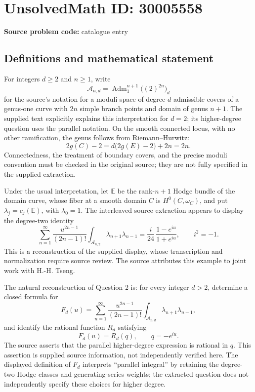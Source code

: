 \documentclass[11pt]{article}
\begin{document}
\section*{UnsolvedMath ID: 30005558}
\textbf{Source problem code:} catalogue entry
\subsection{Definitions and mathematical statement}
For integers \(d\geq 2\) and \(n\geq 1\), write
\[
\mathcal A_{n,d}=\operatorname{Adm}_{1}^{n+1}\bigl((2)^{2n}\bigr)_d
\]
for the source's notation for a moduli space of degree-\(d\) admissible covers of a genus-one curve with \(2n\) simple branch points and domain of genus \(n+1\). The supplied text explicitly explains this interpretation for \(d=2\); its higher-degree question uses the parallel notation. On the smooth connected locus, with no other ramification, the genus follows from Riemann--Hurwitz:
\[
2g(C)-2=d\bigl(2g(E)-2\bigr)+2n=2n.
\]
Connectedness, the treatment of boundary covers, and the precise moduli convention must be checked in the original source; they are not fully specified in the supplied extraction.

Under the usual interpretation, let \(\mathbb E\) be the rank-\(n+1\) Hodge bundle of the domain curve, whose fiber at a smooth domain \(C\) is \(H^0(C,\omega_C)\), and put \(\lambda_j=c_j(\mathbb E)\), with \(\lambda_0=1\). The interleaved source extraction appears to display the degree-two identity
\[
\sum_{n=1}^{\infty}\frac{u^{2n-1}}{(2n-1)!}
\int_{\mathcal A_{n,2}}\lambda_{n+1}\lambda_{n-1}
=\frac{i}{24}\,\frac{1-e^{iu}}{1+e^{iu}},
\qquad i^2=-1.
\]
This is a reconstruction of the supplied display, whose transcription and normalization require source review. The source attributes this example to joint work with H.-H. Tseng.

The natural reconstruction of Question 2 is: for every integer \(d>2\), determine a closed formula for
\[
F_d(u)=\sum_{n=1}^{\infty}\frac{u^{2n-1}}{(2n-1)!}
\int_{\mathcal A_{n,d}}\lambda_{n+1}\lambda_{n-1},
\]
and identify the rational function \(R_d\) satisfying
\[
F_d(u)=R_d(q),\qquad q=-e^{iu}.
\]
The source asserts that the parallel higher-degree expression is rational in \(q\). This assertion is supplied source information, not independently verified here. The displayed definition of \(F_d\) interprets ``parallel integral'' by retaining the degree-two Hodge classes and generating-series weights; the extracted question does not independently specify these choices for higher degree.
\end{document}
